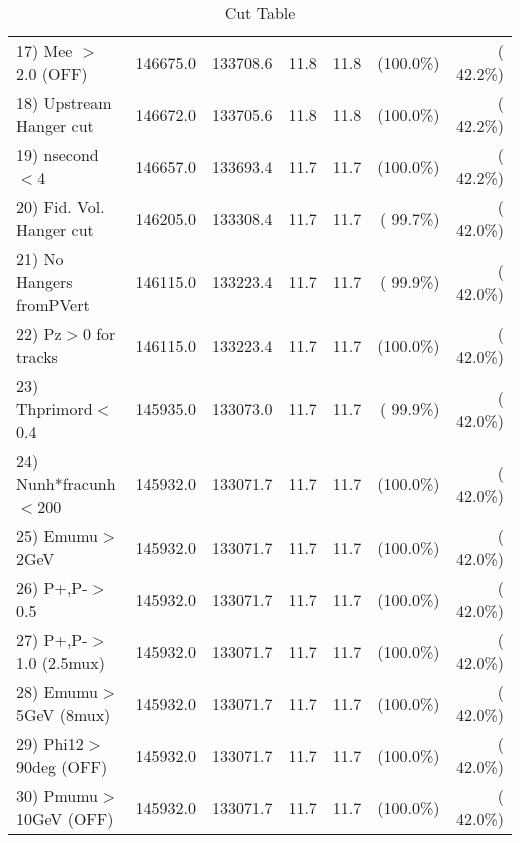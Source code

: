 \begin{table}[h!]
\begin{tabular}{||l||r|r|r|r|r|r||}
 17) Mee $>$ 2.0  (OFF)   &     146675.0 &     133708.6 &         11.8 &         11.8 & (100.0\%) & ( 42.2\%) \\
 18) Upstream Hanger cut  &     146672.0 &     133705.6 &         11.8 &         11.8 & (100.0\%) & ( 42.2\%) \\
 19) nsecond$<$4          &     146657.0 &     133693.4 &         11.7 &         11.7 & (100.0\%) & ( 42.2\%) \\
 20) Fid. Vol. Hanger cut &     146205.0 &     133308.4 &         11.7 &         11.7 & ( 99.7\%) & ( 42.0\%) \\
 21) No Hangers fromPVert &     146115.0 &     133223.4 &         11.7 &         11.7 & ( 99.9\%) & ( 42.0\%) \\
 22) Pz$>$0 for tracks    &     146115.0 &     133223.4 &         11.7 &         11.7 & (100.0\%) & ( 42.0\%) \\
 23) Thprimord$<$0.4      &     145935.0 &     133073.0 &         11.7 &         11.7 & ( 99.9\%) & ( 42.0\%) \\
 24) Nunh*fracunh$<$200   &     145932.0 &     133071.7 &         11.7 &         11.7 & (100.0\%) & ( 42.0\%) \\
 25) Emumu$>$2GeV         &     145932.0 &     133071.7 &         11.7 &         11.7 & (100.0\%) & ( 42.0\%) \\
 26) P+,P-$>$0.5          &     145932.0 &     133071.7 &         11.7 &         11.7 & (100.0\%) & ( 42.0\%) \\
 27) P+,P-$>$1.0 (2.5mux) &     145932.0 &     133071.7 &         11.7 &         11.7 & (100.0\%) & ( 42.0\%) \\
 28) Emumu$>$5GeV  (8mux) &     145932.0 &     133071.7 &         11.7 &         11.7 & (100.0\%) & ( 42.0\%) \\
 29) Phi12$>$90deg  (OFF) &     145932.0 &     133071.7 &         11.7 &         11.7 & (100.0\%) & ( 42.0\%) \\
 30) Pmumu$>$10GeV  (OFF) &     145932.0 &     133071.7 &         11.7 &         11.7 & (100.0\%) & ( 42.0\%) \\
 \hline
 \hline
 \end{tabular}
 \caption{Cut Table           }
 \label{tab-cutcohjpsi-mumu_jpsi}
 \end{table}
